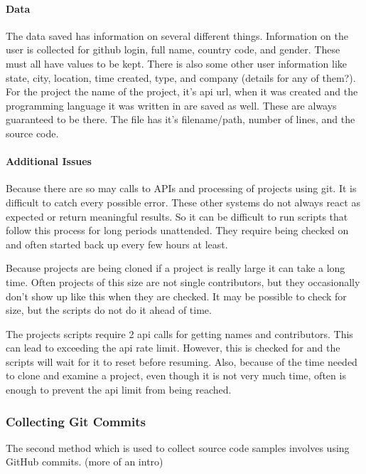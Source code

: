 \documentclass{article}
\begin{document}
\paragraph{Data}
The data saved has information on several different things. Information on the user is collected for github login, full name, country code, and gender. These must all have values to be kept. There is also some other user information like state, city, location, time created, type, and company (details for any of them?). For the project the name of the project, it's api url, when it was created and the programming language it was written in are saved as well. These are always guaranteed to be there. The file has it's filename/path, number of lines, and the source code.

\paragraph{Additional Issues}
Because there are so may calls to APIs and processing of projects using git. It is difficult to catch every possible error. These other systems do not always react as expected or return meaningful results. So it can be difficult to run scripts that follow this process for long periods unattended. They require being checked on and often started back up every few hours at least.

Because projects are being cloned if a project is really large it can take a long time. Often projects of this size are not single contributors, but they occasionally don't show up like this when they are checked. It may be possible to check for size, but the scripts do not do it ahead of time.

The projects scripts require 2 api calls for getting names and contributors. This can lead to exceeding the api rate limit. However, this is checked for and the scripts will wait for it to reset before resuming. Also, because of the time needed to clone and examine a project, even though it is not very much time, often is enough to prevent the api limit from being reached.

\subsubsection{Collecting Git Commits}
The second method which is used to collect source code samples involves using GitHub commits. (more of an intro)
\end{document}
